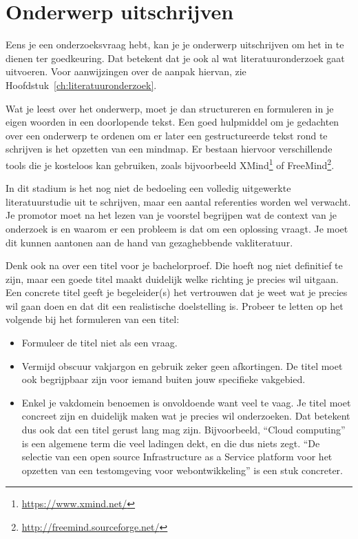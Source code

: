 \section{Onderwerp uitschrijven}
\label{sec:onderwerp_uitschrijven}

Eens je een onderzoeksvraag hebt, kan je je onderwerp uitschrijven om het in te dienen ter goedkeuring. Dat betekent dat je ook al wat literatuuronderzoek gaat uitvoeren. Voor aanwijzingen over de aanpak hiervan, zie Hoofdstuk~\ref{ch:literatuuronderzoek}.

Wat je leest over het onderwerp, moet je dan structureren en formuleren in je eigen woorden in een doorlopende tekst. Een goed hulpmiddel om je gedachten over een onderwerp te ordenen om er later een gestructureerde tekst rond te schrijven is het opzetten van een mindmap. Er bestaan hiervoor verschillende tools die je kosteloos kan gebruiken, zoals bijvoorbeeld XMind\footnote{\url{https://www.xmind.net/}} of FreeMind\footnote{\url{http://freemind.sourceforge.net/}}.


In dit stadium is het nog niet de bedoeling een volledig uitgewerkte literatuurstudie uit te schrijven, maar een aantal referenties worden wel verwacht. Je promotor moet na het lezen van je voorstel begrijpen wat de context van je onderzoek is en waarom er een probleem is dat om een oplossing vraagt. Je moet dit kunnen aantonen aan de hand van gezaghebbende vakliteratuur.

Denk ook na over een titel voor je bachelorproef. Die hoeft nog niet definitief te zijn, maar een goede titel maakt duidelijk welke richting je precies wil uitgaan. Een concrete titel geeft je begeleider(s) het vertrouwen dat je weet wat je precies wil gaan doen en dat dit een realistische doelstelling is. Probeer te letten op het volgende bij het formuleren van een titel:

\begin{itemize}
  \item Formuleer de titel niet als een vraag.
  \item Vermijd obscuur vakjargon en gebruik zeker geen afkortingen. De titel moet ook begrijpbaar zijn voor iemand buiten jouw specifieke vakgebied.
  \item Enkel je vakdomein benoemen is onvoldoende want veel te vaag. Je titel moet concreet zijn en duidelijk maken wat je precies wil onderzoeken. Dat betekent dus ook dat een titel gerust lang mag zijn. Bijvoorbeeld, ``Cloud computing'' is een algemene term die veel ladingen dekt, en die dus niets zegt. ``De selectie van een open source Infrastructure as a Service platform voor het opzetten van een testomgeving voor webontwikkeling'' is een stuk concreter.
\end{itemize}

